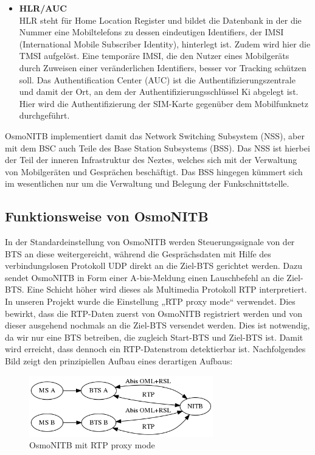 \begin{itemize}
\item \textbf{HLR/AUC}\\
HLR steht für Home Location Register und bildet die Datenbank in der die Nummer eine Mobiltelefons zu dessen eindeutigen Identifiers, der IMSI (International Mobile Subscriber Identity), hinterlegt ist. Zudem wird hier die TMSI aufgelöst. Eine temporäre IMSI, die den Nutzer eines Mobilgeräts durch Zuweisen einer veränderlichen Identifiers, besser vor Tracking schützen soll. Das Authentification Center (AUC) ist die Authentifizierungszentrale und damit der Ort, an dem der Authentifizierungsschlüssel Ki abgelegt ist. Hier wird die Authentifizierung der SIM-Karte gegenüber dem Mobilfunknetz durchgeführt. 


\end{itemize}


OsmoNITB implementiert damit das Network Switching Subsystem (NSS), aber mit dem BSC auch Teile des Base Station Subsystems (BSS). Das NSS ist hierbei der Teil der inneren Infrastruktur des Neztes, welches sich mit der Verwaltung von Mobilgeräten und Gesprächen beschäftigt. Das BSS hingegen kümmert sich im wesentlichen nur um die Verwaltung und Belegung der Funkschnittstelle.


\subsection{Funktionsweise von OsmoNITB}

In der Standardeinstellung von OsmoNITB werden Steuerungssignale von der BTS an diese weitergereicht, während die Gesprächsdaten mit Hilfe des verbindungslosen Protokoll UDP direkt an die Ziel-BTS gerichtet werden. Dazu sendet OsmoNITB in Form einer A-bis-Meldung einen Lauschbefehl an die Ziel-BTS. Eine Schicht höher wird dieses als Multimedia Protokoll RTP interpretiert. In unseren Projekt wurde die Einstellung „RTP proxy mode“ verwendet. Dies bewirkt, dass die RTP-Daten zuerst von OsmoNITB registriert werden und von dieser ausgehend nochmals an die Ziel-BTS versendet werden. Dies ist notwendig, da wir nur eine BTS betreiben, die zugleich Start-BTS und Ziel-BTS ist. Damit wird erreicht, dass dennoch ein RTP-Datenstrom detektierbar ist. Nachfolgendes Bild zeigt den prinzipiellen Aufbau eines derartigen Aufbaus:



\begin{figure}[h]
    \centering
    \includegraphics[width=8cm]{includes/osmonitb_rtp_proxy}
    \caption{OsmoNITB mit RTP proxy mode}
	\label{fig:osmonitb2}
\end{figure}


